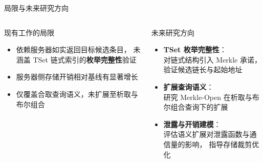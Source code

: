 \begin{frame}{局限与未来研究方向}

  \begin{columns}[T]
      \begin{alertblock}{现有工作的局限}
        \begin{itemize}
          \item 依赖服务器如实返回目标候选条目，
                未涵盖 TSet 链式索引的\textbf{枚举完整性}验证
          \item 服务器侧存储开销相对基线有显著增长
          \item 仅覆盖合取查询语义，未扩展至析取与布尔组合
        \end{itemize}
      \end{alertblock}

      \begin{exampleblock}{未来研究方向}
        \begin{itemize}
          \item[1.] \textbf{TSet 枚举完整性}：\\
                对链式结构引入 Merkle 承诺，
                验证候选链长与起始地址
          \item[2.] \textbf{扩展查询语义}：\\
                研究 Merkle-Open 在析取与布尔组合查询下的扩展
          \item[3.] \textbf{泄露与开销建模}：\\
                评估语义扩展对泄露函数与通信量的影响，
                指导存储裁剪优化
        \end{itemize}
      \end{exampleblock}
  \end{columns}

\end{frame}

